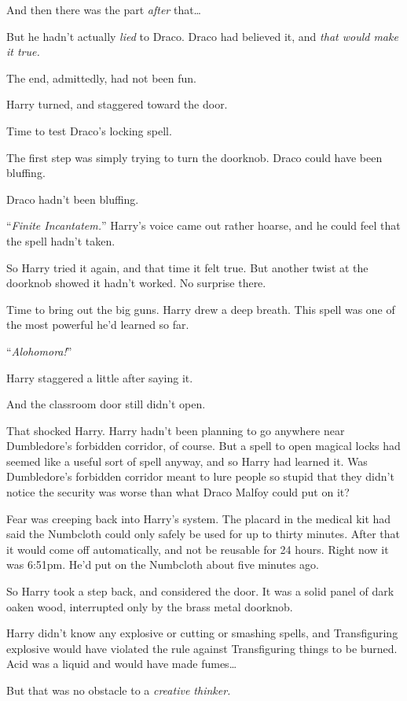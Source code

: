 And then there was the part \emph{after} that…

But he hadn’t actually \emph{lied} to Draco. Draco had believed it, and
\emph{that would make it true.}

The end, admittedly, had not been fun.

Harry turned, and staggered toward the door.

Time to test Draco’s locking spell.

The first step was simply trying to turn the doorknob. Draco could have been
bluffing.

Draco hadn’t been bluffing.

“\emph{Finite Incantatem.}” Harry’s voice came out rather hoarse, and he could
feel that the spell hadn’t taken.

So Harry tried it again, and that time it felt true. But another twist at the
doorknob showed it hadn’t worked. No surprise there.

Time to bring out the big guns. Harry drew a deep breath. This spell was one of
the most powerful he’d learned so far.

“\emph{Alohomora!}”

Harry staggered a little after saying it.

And the classroom door still didn’t open.

That shocked Harry. Harry hadn’t been planning to go anywhere near Dumbledore’s
forbidden corridor, of course. But a spell to open magical locks had seemed
like a useful sort of spell anyway, and so Harry had learned it. Was
Dumbledore’s forbidden corridor meant to lure people so stupid that they didn’t
notice the security was worse than what Draco Malfoy could put on it?

Fear was creeping back into Harry’s system. The placard in the medical kit had
said the Numbcloth could only safely be used for up to thirty minutes. After
that it would come off automatically, and not be reusable for 24 hours. Right
now it was 6:51pm. He’d put on the Numbcloth about five minutes ago.

So Harry took a step back, and considered the door. It was a solid panel of
dark oaken wood, interrupted only by the brass metal doorknob.

Harry didn’t know any explosive or cutting or smashing spells, and
Transfiguring explosive would have violated the rule against Transfiguring
things to be burned. Acid was a liquid and would have made fumes…

But that was no obstacle to a \emph{creative thinker.}

